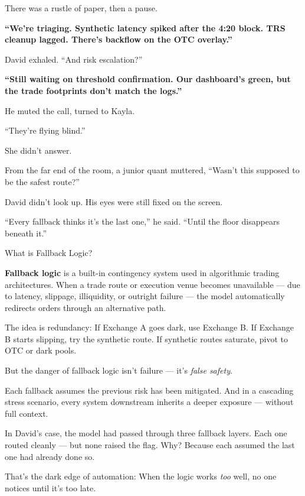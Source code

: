 There was a rustle of paper, then a pause.

\textbf{“We’re triaging. Synthetic latency spiked after the 4:20 block. TRS cleanup lagged. There’s backflow 
on the OTC overlay.”}

David exhaled. “And risk escalation?”

\textbf{“Still waiting on threshold confirmation. Our dashboard’s green, but the trade footprints 
don’t match the logs.”}

He muted the call, turned to Kayla.

“They’re flying blind.”

She didn’t answer.

From the far end of the room, a junior quant muttered, “Wasn’t this supposed to be the safest route?”

David didn’t look up. His eyes were still fixed on the screen.

“Every fallback thinks it’s the last one,” he said. “Until the floor disappears beneath it.”

\begin{TechnicalSidebar}{What is Fallback Logic?}

  \textbf{Fallback logic} is a built-in contingency system used in algorithmic trading architectures.  
  When a trade route or execution venue becomes unavailable — due to latency, slippage, illiquidity, or outright failure —  
  the model automatically redirects orders through an alternative path.

  \medskip

  The idea is redundancy:  
  If Exchange A goes dark, use Exchange B.  
  If Exchange B starts slipping, try the synthetic route.  
  If synthetic routes saturate, pivot to OTC or dark pools.

  \medskip

  But the danger of fallback logic isn’t failure — it’s \textit{false safety}.

  \medskip

  Each fallback assumes the previous risk has been mitigated.  
  And in a cascading stress scenario, every system downstream inherits a deeper exposure — without full context.  

  \medskip

  In David’s case, the model had passed through three fallback layers.  
  Each one routed cleanly — but none raised the flag.  
  Why? Because each assumed the last one had already done so.

  \medskip

  That’s the dark edge of automation:  
  When the logic works \textit{too} well, no one notices until it’s too late.

\end{TechnicalSidebar}


